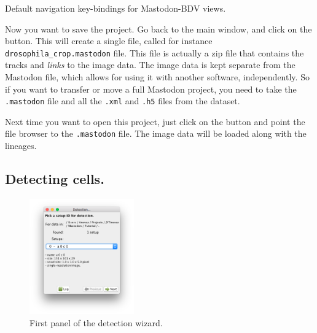 \begin{table}[!htbp]
    \centering
    
    \caption{Default navigation key-bindings for Mastodon-BDV views.}

    

    \label{tab:MastodonBDVNavigationKeys}
    \vspace{-10pt}

\end{table}

Now you want to save the project. 
Go back to the main window, and click on the  button.
This will create a single file, called for instance \texttt{drosophila\_crop.mastodon} file. 
This file is actually a zip file that contains the tracks and \textit{links} to the image data.
The image data is kept separate from the Mastodon file, which allows for using it with another software, independently. 
So if you want to transfer or move a full Mastodon project, you need to take the \texttt{.mastodon} file and all the \texttt{.xml} and \texttt{.h5} files from the \Bdv dataset.

Next time you want to open this project, just click on the  button and point the file browser to the \texttt{.mastodon} file.
The image data will be loaded along with the lineages.



\subsection{Detecting cells.}
\label{Detecting_Cells}

\begin{figure}
    \centering
     \includegraphics[width=0.4\textwidth]{figures/Mastodon_DetectionWizard_01.png}
     \caption{First panel of the detection wizard.}
     \label{fig:DetectionWizardFirstPanel}
\end{figure}

